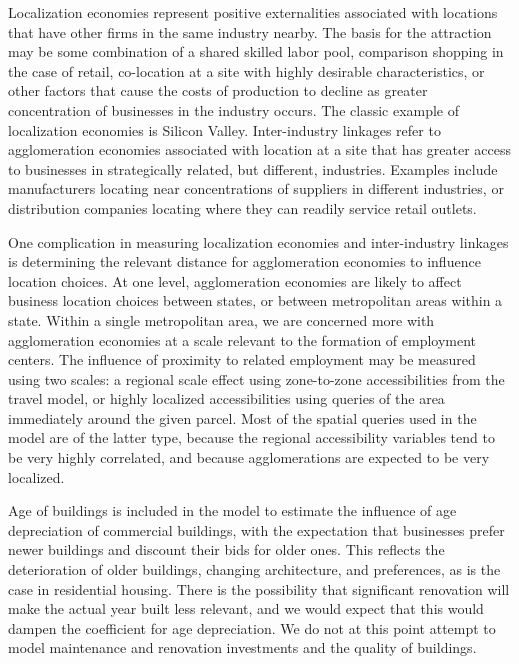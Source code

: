 Localization economies represent positive externalities associated
with locations that have other firms in the same industry nearby.
The basis for the attraction may be some combination of a shared
skilled labor pool, comparison shopping in the case of retail,
co-location at a site with highly desirable characteristics, or
other factors that cause the costs of production to decline as
greater concentration of businesses in the industry occurs.  The
classic example of localization economies is Silicon Valley.
Inter-industry linkages refer to agglomeration economies
associated with location at a site that has greater access to
businesses in strategically related, but different, industries.
Examples include manufacturers locating near concentrations of
suppliers in different industries, or distribution companies
locating where they can readily service retail outlets.

One complication in measuring localization economies and
inter-industry linkages is determining the relevant distance for
agglomeration economies to influence location choices.  At one
level, agglomeration economies are likely to affect business
location choices between states, or between metropolitan areas
within a state.  Within a single metropolitan area, we are
concerned more with agglomeration economies at a scale relevant to
the formation of employment centers.  The influence of proximity
to related employment may be measured using two scales: a regional
scale effect using zone-to-zone accessibilities from the travel
model, or highly localized accessibilities using queries of the
area immediately around the given parcel.  Most of the spatial
queries used in the model are of the latter type, because the
regional accessibility variables tend to be very highly
correlated, and because agglomerations are expected to be very
localized.

Age of buildings is included in the model to estimate the
influence of age depreciation of commercial buildings, with the
expectation that businesses prefer newer buildings and discount
their bids for older ones.  This reflects the deterioration of
older buildings, changing architecture, and preferences, as is the
case in residential housing.  There is the possibility that
significant renovation will make the actual year built less
relevant, and we would expect that this would dampen the
coefficient for age depreciation.  We do not at this point attempt
to model maintenance and renovation investments and the quality of
buildings.

